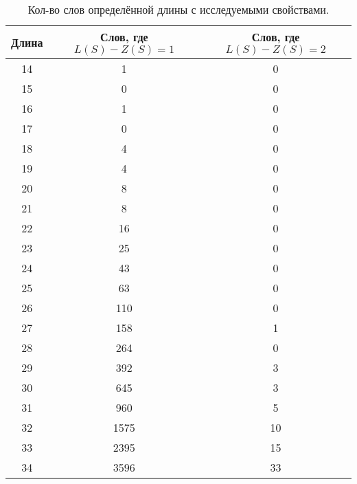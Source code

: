\begin{table}[h]
\caption{Кол-во слов определённой длины с исследуемыми свойствами.}
\begin{center}
\begin{tabular}{|c|c|c|}
\hline
Длина &
\specialcell{Слов, где\\ $L(S) - Z(S) = 1$} &
\specialcell{Слов, где\\ $L(S) - Z(S) = 2$} \\
\hline
14 & 1 & 0 \\
15 & 0 & 0 \\
16 & 1 & 0 \\
17 & 0 & 0 \\
18 & 4 & 0 \\
19 & 4 & 0 \\
20 & 8 & 0 \\
21 & 8 & 0 \\
22 & 16 & 0 \\
23 & 25 & 0 \\
24 & 43 & 0 \\
25 & 63 & 0 \\
26 & 110 & 0 \\
27 & 158 & 1 \\
28 & 264 & 0 \\
29 & 392 & 3 \\
30 & 645 & 3 \\
31 & 960 & 5 \\
32 & 1575 & 10 \\
33 & 2395 & 15 \\
34 & 3596 & 33 \\
\hline
\end{tabular}
\end{center}
\end{table}
